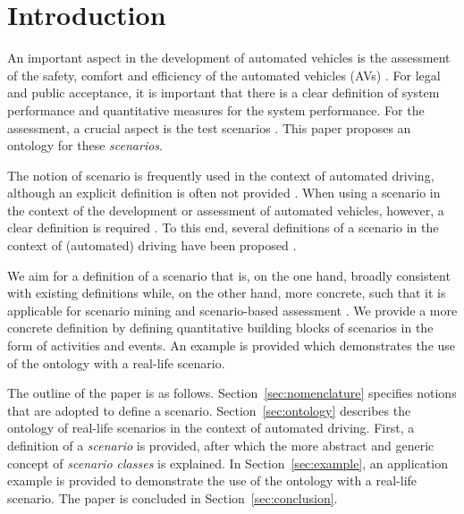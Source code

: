 \section{Introduction}
\label{sec:introduction}

An important aspect in the development of automated vehicles is the assessment of the safety, comfort and efficiency of the automated vehicles (AVs) \cite{bengler2014threedecades, stellet2015taxonomy, Helmer2017safety, putz2017pegasus, roesener2017comprehensive, gietelink2006development}. For legal and public acceptance, it is important that there is a clear definition of system performance and quantitative measures for the system performance. For the assessment, a crucial aspect is the test scenarios \cite{stellet2015taxonomy}. This paper proposes an ontology for these \emph{scenarios}.

The notion of scenario is frequently used in the context of automated driving, although an explicit definition is often not provided \cite{putz2017pegasus, roesener2017comprehensive, gietelink2006development, hulshof2013autonomous, karaduman2013interactivebehavior, englund2016grand, xu2002effects, ebner2011identifying, ploeg2017GCDC, zofka2015datadrivetrafficscenarios}. When using a scenario in the context of the development or assessment of automated vehicles, however, a clear definition is required \cite{stellet2015taxonomy, Helmer2017safety, alvarez2017prospective, zofka2015datadrivetrafficscenarios, aparicio2013pre, lesemann2011test, putz2017pegasus, geyer2014, ulbrich2015}. To this end, several definitions of a scenario in the context of (automated) driving have been proposed \cite{geyer2014, ulbrich2015, elrofai2016scenario}.

We aim for a definition of a scenario that is, on the one hand, broadly consistent with existing definitions \cite{geyer2014, ulbrich2015, elrofai2016scenario} while, on the other hand, more concrete, such that it is applicable for scenario mining \cite{elrofai2016scenario} and scenario-based assessment \cite{stellet2015taxonomy, deGelder2017assessment}. We provide a more concrete definition by defining quantitative building blocks of scenarios in the form of activities and events. An example is provided which demonstrates the use of the ontology with a real-life scenario.

The outline of the paper is as follows. Section~\ref{sec:nomenclature} specifies notions that are adopted to define a scenario. Section~\ref{sec:ontology} describes the ontology of real-life scenarios in the context of automated driving. First, a definition of a \emph{scenario} is provided, after which the more abstract and generic concept of \emph{scenario classes} is explained. In Section~\ref{sec:example}, an application example is provided to demonstrate the use of the ontology with a real-life scenario. 
The paper is concluded in Section~\ref{sec:conclusion}.
